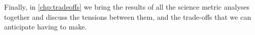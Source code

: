 Finally, in \autoref{chp:tradeoffs} we bring the results of all the
science metric analyses  together and discuss the tensions between
them, and the trade-offs that we can anticipate having to make.

\navigationbar

